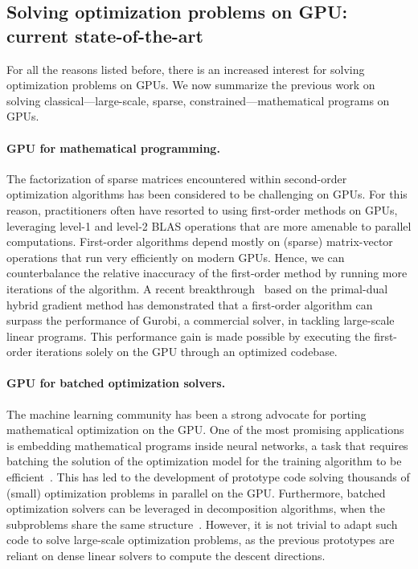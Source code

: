 \subsection{Solving optimization problems on GPU: current state-of-the-art}
For all the reasons listed before, there is an increased interest for solving optimization problems on GPUs.
We now summarize the previous work on solving classical---large-scale, sparse, constrained---mathematical programs on GPUs.

\paragraph{GPU for mathematical programming.}
The factorization of sparse matrices encountered within second-order optimization algorithms has been considered to be challenging  on GPUs.
For this reason, practitioners often have resorted to using first-order
methods on GPUs, leveraging level-1 and level-2 BLAS operations that
are more amenable to parallel computations.
First-order algorithms depend mostly on (sparse) matrix-vector operations that run
very efficiently on modern GPUs. Hence, we can counterbalance
the relative inaccuracy of the first-order method by running more
iterations of the algorithm.
A recent breakthrough~\cite{lu2023cupdlp,lu2023cupdlp2} based on the primal-dual hybrid gradient method has demonstrated
that a first-order algorithm can surpass the performance of Gurobi, a
commercial solver, in tackling large-scale linear programs. This
performance gain is made possible by executing the first-order
iterations solely on the GPU through an optimized codebase.

\paragraph{GPU for batched optimization solvers.}
The machine learning community has been a strong advocate for porting
mathematical optimization on the GPU. One of the most promising
applications is embedding mathematical programs inside neural networks,
a task that requires batching the solution of the optimization model
for the training algorithm to be
efficient~\cite{amos2017optnet,pineda2022theseus}.  This has led to
the development of prototype code solving thousands of (small)
optimization problems in parallel on the GPU.
Furthermore, batched optimization solvers can be leveraged
in decomposition algorithms, when the subproblems share the same structure~\cite{kimLeveragingGPUBatching2021}.
However, it is not trivial to adapt such code to solve large-scale optimization problems,
as the previous prototypes are reliant on dense linear solvers to
compute the descent directions.

